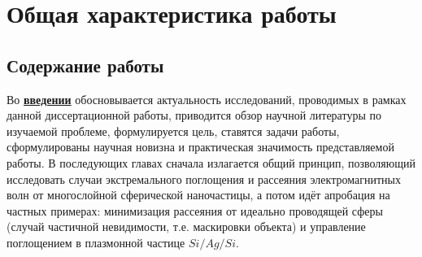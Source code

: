 \section*{Общая характеристика работы}

\newcommand{\actuality}{\underline{\textbf{\actualityTXT}}}
\newcommand{\progress}{\underline{\textbf{\progressTXT}}}
\newcommand{\aim}{\underline{{\textbf\aimTXT}}}
\newcommand{\tasks}{\underline{\textbf{\tasksTXT}}}
\newcommand{\novelty}{\underline{\textbf{\noveltyTXT}}}
\newcommand{\influence}{\underline{\textbf{\influenceTXT}}}
\newcommand{\methods}{\underline{\textbf{\methodsTXT}}}
\newcommand{\defpositions}{\underline{\textbf{\defpositionsTXT}}}
\newcommand{\reliability}{\underline{\textbf{\reliabilityTXT}}}
\newcommand{\probation}{\underline{\textbf{\probationTXT}}}
\newcommand{\contribution}{\underline{\textbf{\contributionTXT}}}
\newcommand{\publications}{\underline{\textbf{\publicationsTXT}}}




\subsection*{Содержание работы}
Во \underline{\textbf{введении}} обосновывается актуальность
исследований, проводимых в рамках данной диссертационной работы,
приводится обзор научной литературы по изучаемой проблеме,
формулируется цель, ставятся задачи работы, сформулированы научная
новизна и практическая значимость представляемой работы. В последующих
главах сначала излагается общий принцип, позволяющий исследовать
случаи экстремального поглощения и рассеяния электромагнитных волн от
многослойной сферической наночастицы, а потом идёт апробация на
частных примерах: минимизация рассеяния от идеально проводящей сферы
(случай частичной невидимости, т.е. маскировки объекта) и управление
поглощением в плазмонной частице $Si/Ag/Si$.


